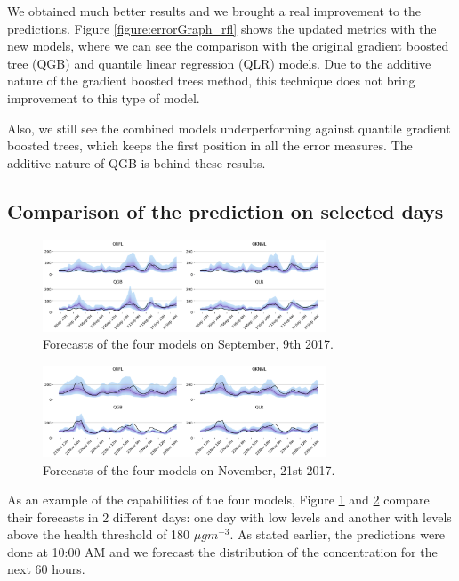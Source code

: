 \documentclass[a4paper,twocolumn,5p]{elsarticle}
\begin{document}
We obtained much better results and we brought a real improvement to
the predictions. Figure \ref{figure:errorGraph_rfl} shows the updated
metrics with the new models, where we can see the comparison with the
original gradient boosted tree (QGB) and quantile linear regression
(QLR) models. Due to the additive nature of the gradient boosted trees
method, this technique does not bring improvement to this type of
model.

Also, we still see the combined models underperforming against
quantile gradient boosted trees, which keeps the first position in all
the error measures. The additive nature of QGB is behind these
results. 

\subsection{Comparison of the prediction on selected days}

\begin{figure}
  \centering
  \includegraphics[width=0.75\textwidth]{evoday1}
  \caption{Forecasts of the four models on September, 9th
    2017.}
  \label{figure:evoday1} 
\end{figure}

\begin{figure}
  \centering
  \includegraphics[width=0.75\textwidth]{evoday2}
  \caption{Forecasts of the four models on November, 21st 2017.}
  \label{figure:evoday2} 
\end{figure}

As an example of the capabilities of the four models, Figure
\ref{figure:evoday1} and \ref{figure:evoday2} compare their forecasts
in 2 different days: one day with low \no levels and another with
levels above the health threshold of 180 $\mu gm^{-3}$.  As stated
earlier, the predictions were done at 10:00 AM and we forecast the
distribution of the concentration for the next 60 hours.
\end{document}
